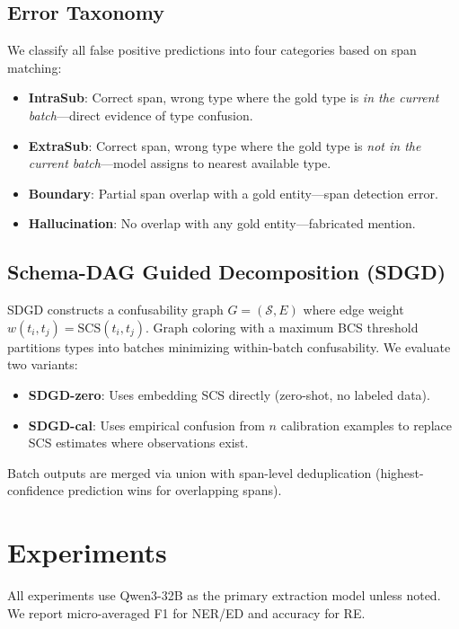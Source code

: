 \documentclass[11pt,a4paper]{article}
\begin{document}
\subsection{Error Taxonomy}
\label{sec:taxonomy_method}

We classify all false positive predictions into four categories based on span matching:
\begin{itemize}
\item \textbf{IntraSub}: Correct span, wrong type where the gold type is \emph{in the current batch}---direct evidence of type confusion.
\item \textbf{ExtraSub}: Correct span, wrong type where the gold type is \emph{not in the current batch}---model assigns to nearest available type.
\item \textbf{Boundary}: Partial span overlap with a gold entity---span detection error.
\item \textbf{Hallucination}: No overlap with any gold entity---fabricated mention.
\end{itemize}

\subsection{Schema-DAG Guided Decomposition (SDGD)}
\label{sec:sdgd_method}

SDGD constructs a confusability graph $G = (\mathcal{S}, E)$ where edge weight $w(t_i, t_j) = \text{SCS}(t_i, t_j)$. Graph coloring with a maximum BCS threshold partitions types into batches minimizing within-batch confusability. We evaluate two variants:
\begin{itemize}
\item \textbf{SDGD-zero}: Uses embedding SCS directly (zero-shot, no labeled data).
\item \textbf{SDGD-cal}: Uses empirical confusion from $n$ calibration examples to replace SCS estimates where observations exist.
\end{itemize}

Batch outputs are merged via union with span-level deduplication (highest-confidence prediction wins for overlapping spans).

\section{Experiments}

All experiments use Qwen3-32B as the primary extraction model unless noted. We report micro-averaged F1 for NER/ED and accuracy for RE.
\end{document}
